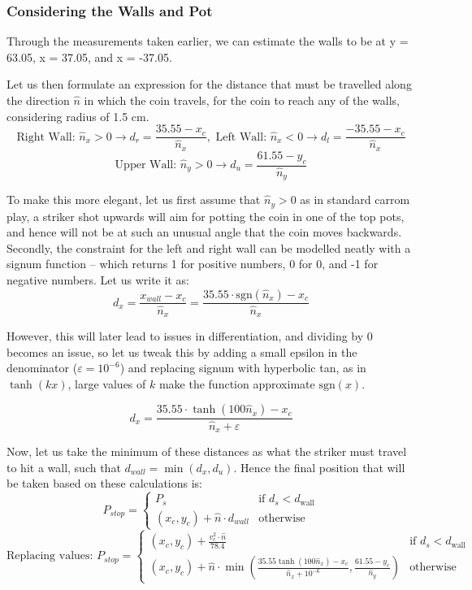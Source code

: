 \documentclass[10pt]{article}
\begin{document}
\subsubsection{Considering the Walls and Pot}

Through the measurements taken earlier, we can estimate the walls to be at y = 63.05, x = 37.05, and x = -37.05. 

Let us then formulate an expression for the distance that must be travelled along the direction $\hat{n}$ in which the coin travels, for the coin to reach any of the walls, considering radius of 1.5 cm.
\[
\text{Right Wall: } \hat{n}_x > 0 \rightarrow d_r = \frac{35.55 - x_c}{\hat{n}_x}, \text{ Left Wall: } \hat{n}_x < 0 \rightarrow d_l = \frac{-35.55 - x_c}{\hat{n}_x}
\]
\[
\text{Upper Wall: }\hat{n}_y > 0 \rightarrow d_u = \frac{61.55 - y_c}{\hat{n}_y}
\]

To make this more elegant, let us first assume that $\hat{n}_y > 0$ as in standard carrom play, a striker shot upwards will aim for potting the coin in one of the top pots, and hence will not be at such an unusual angle that the coin moves backwards. Secondly, the constraint for the left and right wall can be modelled neatly with a signum function -- which returns 1 for positive numbers, 0 for 0, and -1 for negative numbers. Let us write it as:
\[
d_x = \frac{x_{wall} - x_c}{\hat{n}_x}
= \frac{35.55 \cdot \text{sgn}(\hat{n}_x) - x_c}{\hat{n}_x}
\]

However, this will later lead to issues in differentiation, and dividing by 0 becomes an issue, so let us tweak this by adding a small epsilon in the denominator ($\varepsilon = 10^{-6}$) and replacing signum with hyperbolic tan, as in $\tanh(kx)$, large values of $k$ make the function approximate $\text{sgn}(x)$. 

\[
d_x = \frac{35.55 \cdot \tanh(100\hat{n}_x) - x_c}{\hat{n}_x + \varepsilon}
\]

Now, let us take the minimum of these distances as what the striker must travel to hit a wall, such that $d_{wall} = \min(d_x,d_u)$. Hence the final position that will be taken based on these calculations is:
\[
P_{stop} =
\begin{cases}
P_s & \text{if } d_s < d_{\text{wall}} \\
(x_c, y_c) + \hat{n} \cdot d_{wall} & \text{otherwise}
\end{cases}
\]
\[
\text{Replacing values: } P_{stop} =
\begin{cases}
(x_c,y_c) + \frac{v_c^2 \cdot \hat{n}}{78.4} & \text{if } d_s < d_{\text{wall}} \\
(x_c, y_c) + \hat{n} \cdot \min(\frac{35.55 \tanh(100\hat{n}_x) - x_c}{\hat{n}_x + 10^{-6}},\frac{61.55 - y_c}{\hat{n}_y}) & \text{otherwise}
\end{cases}
\]
\end{document}
